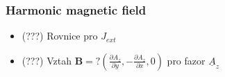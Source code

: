 \documentclass[smallextended]{svjour3}       %
\begin{document}
		\subsubsection{Harmonic magnetic field}
		\begin{itemize}
			\item (???) Rovnice pro $J_{ext}$
			\item (???) Vztah $\mathbf{B} =? \left( \frac{\partial A_z}{\partial y}, -\frac{\partial A_z}{\partial x}, 0 \right)$ pro fazor $\underline A_z$
		\end{itemize}
		
\end{document}
